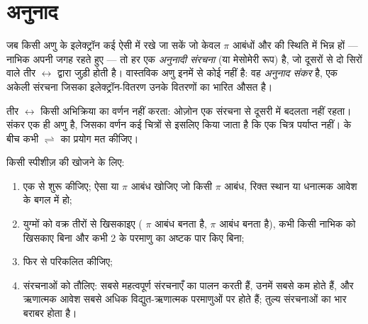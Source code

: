 \section{अनुनाद}

\begin{definition}[अनुनादी संरचनाएँ, अनुनाद संकर]\label{def:b1:lewis-resonance-vsepr:resonance}
जब किसी अणु के इलेक्ट्रॉन कई ऐसी  में रखे जा सकें जो केवल
$\pi$ आबंधों और  की स्थिति में भिन्न हों --- नाभिक अपनी जगह
रहते हुए --- तो हर एक \emph{अनुनादी
संरचना} (या मेसोमेरी रूप) है, जो
दूसरों से दो सिरों वाले तीर $\leftrightarrow$ द्वारा जुड़ी होती है। वास्तविक अणु
इनमें से कोई नहीं है: वह \emph{अनुनाद संकर} है,
एक अकेली संरचना जिसका इलेक्ट्रॉन-वितरण उनके वितरणों का भारित
औसत है।
\end{definition}

\begin{remark}[एक तीर, साम्य नहीं]\label{rem:b1:lewis-resonance-vsepr:arrow}
तीर $\leftrightarrow$ किसी अभिक्रिया का वर्णन नहीं करता: ओज़ोन एक संरचना से
दूसरी में बदलता नहीं रहता। संकर एक ही अणु है, जिसका वर्णन कई
चित्रों से इसलिए किया जाता है कि एक चित्र पर्याप्त नहीं।  के
बीच कभी $\rightleftharpoons$ का प्रयोग मत कीजिए।
\end{remark}

\begin{method}[अनुनादी संरचनाएँ लिखना और तौलना]\label{met:b1:lewis-resonance-vsepr:resonance}
किसी स्पीशीज़ की  खोजने के लिए:
\begin{enumerate}
  \item एक  से शुरू कीजिए; ऐसा  या
        $\pi$ आबंध खोजिए जो किसी $\pi$ आबंध, रिक्त स्थान या धनात्मक
        आवेश के बगल में हो;
  \item युग्मों को वक्र तीरों से खिसकाइए ( $\pi$ आबंध बनता है,
        $\pi$ आबंध  बनता है), कभी किसी नाभिक को खिसकाए बिना और कभी
         2 के परमाणु का अष्टक पार किए बिना;
  \item {} फिर से परिकलित कीजिए;
  \item संरचनाओं को तौलिए: सबसे महत्वपूर्ण संरचनाएँ  का पालन करती हैं, उनमें सबसे कम  होते हैं, और ऋणात्मक आवेश
        सबसे अधिक विद्युत-ऋणात्मक परमाणुओं पर होते हैं; तुल्य संरचनाओं का भार
        बराबर होता है।
\end{enumerate}
\end{method}

